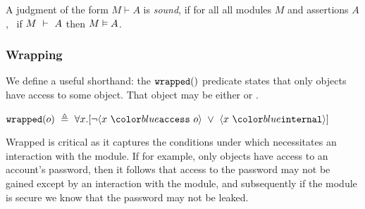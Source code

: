 \begin{definition}
\label{ax:specW-prove-soundness}
A judgment of the form $M \vdash A$ is \emph{sound}, if for all
  all modules $M$ and assertions $A$, \ if $M\ \vdash\ A$ then $M \vDash A$.
\end{definition}

\subsubsection{Wrapping}

We define a useful shorthand:  the $\texttt{wrapped}(  )$ predicate  states 
that only \internalO objects have access to some object.
That object may be either \internalO or \externalO.
\begin{definition}[Wrapped]
$\wrapped{o}\ \triangleq\ \all{x}{\neg \access{x}{o}\ \vee\ \internal{x}}$
\end{definition}
Wrapped is critical as it captures the conditions under which 
necessitates an interaction
with the \internalM module. If for example, only \internalO
objects have access to an account's password, then
it follows that access to the password may not 
be gained except by an interaction with the \internalM
module, and subsequently if the \internalM module
is secure we know that the password may not be leaked.
 
 

	
